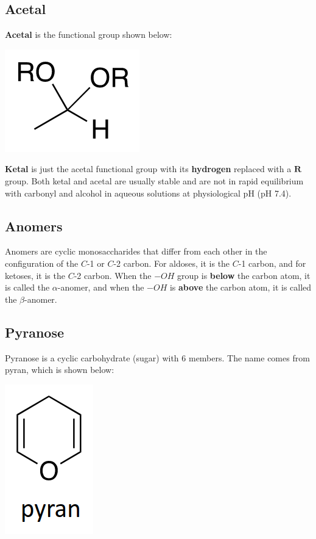 \documentclass[11pt]{article}
\begin{document}
\newpage

\subsection{Acetal}
\label{sec:org5071566}
\textbf{Acetal} is the functional group shown below:

\begin{center}
\includegraphics[scale=1.0]{./images/acetal.png}
\end{center}

\textbf{Ketal} is just the acetal functional group with its \textbf{hydrogen} replaced with a \(\boldsymbol{R}\) group. Both ketal and acetal are usually stable and are not in rapid equilibrium with carbonyl and alcohol in aqueous solutions at physiological pH (pH 7.4).

\subsection{Anomers}
\label{sec:orgc11eac7}
Anomers are cyclic monosaccharides that differ from each other in the configuration of the \(C\)-1 or \(C\)-2 carbon. For aldoses, it is the \(C\)-1 carbon, and for ketoses, it is the \(C\)-2 carbon. When the \(-OH\) group is \textbf{below} the carbon atom, it is called the \(\alpha\)-anomer, and when the \(-OH\) is \textbf{above} the carbon atom, it is called the \(\beta\)-anomer.

\subsection{Pyranose}
\label{sec:orgf4405fa}
Pyranose is a cyclic carbohydrate (sugar) with 6 members. The name comes from pyran, which is shown below:

\begin{center}
\includegraphics[scale=1.0]{./images/pyran.png}
\end{center}
\end{document}
